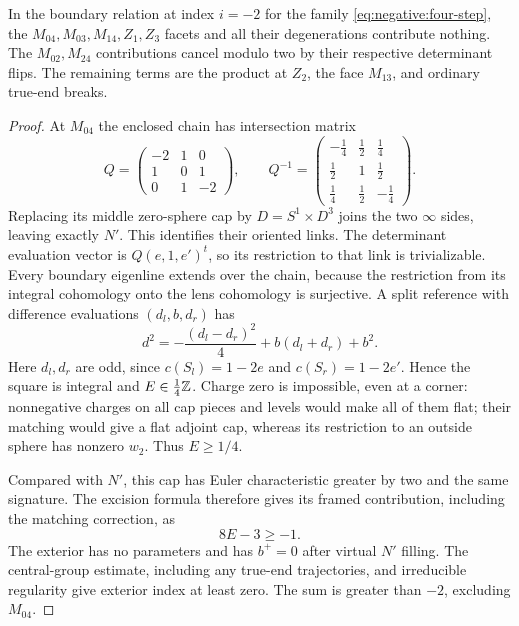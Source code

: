 \begin{lemma}\label{lem:negative:faces}
In the boundary relation at index $i=-2$ for the family
\eqref{eq:negative:four-step}, the $M_{04},M_{03},M_{14},Z_1,Z_3$
facets and all their degenerations contribute nothing.  The
$M_{02},M_{24}$ contributions cancel modulo two by their respective
determinant flips.  The remaining terms are the product at $Z_2$,
the face $M_{13}$, and ordinary true-end breaks.
\end{lemma}

\begin{proof}
At $M_{04}$ the enclosed chain has intersection matrix
\[
 Q=\begin{pmatrix}-2&1&0\\1&0&1\\0&1&-2\end{pmatrix},
 \qquad
 Q^{-1}=\begin{pmatrix}-\tfrac14&\tfrac12&\tfrac14\\
 \tfrac12&1&\tfrac12\\\tfrac14&\tfrac12&-\tfrac14\end{pmatrix}.
\]
Replacing its middle zero-sphere cap by $D=S^1\times D^3$ joins the
two $\infty$ sides, leaving exactly $N'$.  This identifies their
oriented links.  The determinant evaluation vector is
$Q(e,1,e')^t$, so its restriction to that link is trivializable.
Every boundary eigenline extends over the chain, because the
restriction from its integral cohomology onto the lens cohomology is
surjective.  A split reference with difference evaluations
$(d_l,b,d_r)$ has
\begin{equation}\label{eq:negative:chain-square}
 d^2=-\frac{(d_l-d_r)^2}{4}+b(d_l+d_r)+b^2.
\end{equation}
Here $d_l,d_r$ are odd, since
$c(S_l)=1-2e$ and $c(S_r)=1-2e'$.  Hence the square is integral and
$E\in\frac14\mathbb Z$.  Charge zero is impossible, even at a corner:
nonnegative charges on all cap pieces and levels would make all of
them flat; their matching would give a flat adjoint cap, whereas its
restriction to an outside sphere has nonzero $w_2$.  Thus $E\ge1/4$.

Compared with $N'$, this cap has Euler characteristic greater by two
and the same signature.  The excision formula therefore gives its
framed contribution, including the matching correction, as
\begin{equation}\label{eq:negative:large-shift}
 8E-3\ge-1.
\end{equation}
The exterior has no parameters and has $b^+=0$ after virtual $N'$
filling.  The central-group estimate, including any true-end
trajectories, and irreducible regularity give exterior index at least
zero.  The sum is greater than $-2$, excluding $M_{04}$.


\end{proof}
